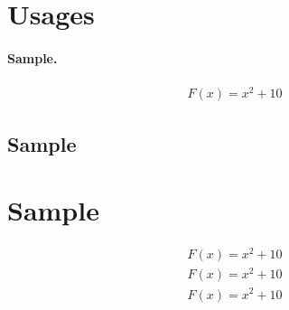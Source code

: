 \section{Usages}

\def\ftext{\lipsum[75]}

\paragraph{Sample.} \ftext

\noh \ftext
\begin{definition}[Sample]
  \ftext
\end{definition}
\snoh \ftext
\begin{align*}
  F(x) = x^2 + 10
\end{align*}
\sno \ftext
\no \ftext
\snoh \ftext
\ssnoh \ttt\ftext

\subsection{Sample}

\begin{definition}[Sample]
  \ftext
\end{definition}

\noh \ftext
\snoh \ftext
\sno \ftext
\no \ftext

\section{Sample}

\begin{align*}
  F(x) = x^2 + 10 \\
  F(x) = x^2 + 10 \\
  F(x) = x^2 + 10
\end{align*}

\noh \ftext
\snoh \ftext
\ssnoh \ftext

\the\abovedisplayskip